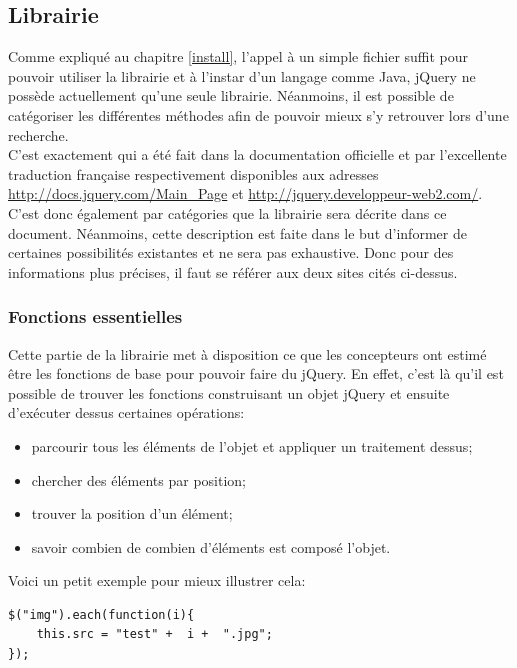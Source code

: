 \documentclass[10pt,a4paper,titlepage]{article}
\begin{document}
\subsection{Librairie}
Comme expliqué au chapitre \ref{install}, l'appel à un simple fichier suffit pour pouvoir utiliser la librairie et à l'instar d'un langage comme Java, jQuery ne possède actuellement qu'une seule librairie. Néanmoins, il est possible de catégoriser les différentes méthodes afin de pouvoir mieux s'y retrouver lors d'une recherche.\\

C'est exactement qui a été fait dans la documentation officielle et par l'excellente traduction française respectivement disponibles aux adresses \url{http://docs.jquery.com/Main_Page} et \url{http://jquery.developpeur-web2.com/}.\\

C'est donc également par catégories que la librairie sera décrite dans ce document. Néanmoins, cette description est faite dans le but d'informer de certaines possibilités existantes et ne sera pas exhaustive. Donc pour des informations plus précises, il faut se référer aux deux sites cités ci-dessus.

\subsubsection{Fonctions essentielles}
Cette partie de la librairie met à disposition ce que les concepteurs ont estimé être les fonctions de base pour pouvoir faire du jQuery. En effet, c'est là qu'il est possible de trouver les fonctions construisant un objet jQuery et ensuite d'exécuter dessus certaines opérations:

\begin{itemize}
	\item parcourir tous les éléments de l'objet et appliquer un traitement dessus;
	\item chercher des éléments par position;
	\item trouver la position d'un élément;
	\item savoir combien de combien d'éléments est composé l'objet.\\
\end{itemize}

Voici un petit exemple pour mieux illustrer cela:

\begin{lstlisting}
$("img").each(function(i){
	this.src = "test" +  i +  ".jpg";
});
\end{lstlisting}
\end{document}
